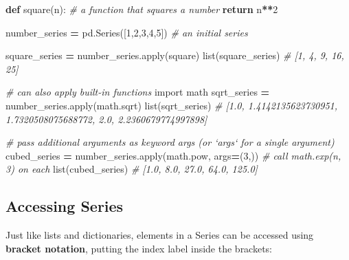 \documentclass[]{book}
\newenvironment{Shaded}{\begin{snugshade}}{\end{snugshade}}
\newcommand{\KeywordTok}[1]{\textcolor[rgb]{0.13,0.29,0.53}{\textbf{#1}}}
\newcommand{\DecValTok}[1]{\textcolor[rgb]{0.00,0.00,0.81}{#1}}
\newcommand{\ImportTok}[1]{#1}
\newcommand{\CommentTok}[1]{\textcolor[rgb]{0.56,0.35,0.01}{\textit{#1}}}
\newcommand{\ControlFlowTok}[1]{\textcolor[rgb]{0.13,0.29,0.53}{\textbf{#1}}}
\newcommand{\OperatorTok}[1]{\textcolor[rgb]{0.81,0.36,0.00}{\textbf{#1}}}
\newcommand{\BuiltInTok}[1]{#1}
\newcommand{\NormalTok}[1]{#1}
\begin{document}
\begin{Shaded}
\begin{Highlighting}[]
\KeywordTok{def}\NormalTok{ square(n):  }\CommentTok{# a function that squares a number}
    \ControlFlowTok{return}\NormalTok{ n}\OperatorTok{**}\DecValTok{2}

\NormalTok{number_series }\OperatorTok{=}\NormalTok{ pd.Series([}\DecValTok{1}\NormalTok{,}\DecValTok{2}\NormalTok{,}\DecValTok{3}\NormalTok{,}\DecValTok{4}\NormalTok{,}\DecValTok{5}\NormalTok{])  }\CommentTok{# an initial series}

\NormalTok{square_series }\OperatorTok{=}\NormalTok{ number_series.}\BuiltInTok{apply}\NormalTok{(square)}
\BuiltInTok{list}\NormalTok{(square_series)  }\CommentTok{# [1, 4, 9, 16, 25]}

\CommentTok{# can also apply built-in functions}
\ImportTok{import}\NormalTok{ math}
\NormalTok{sqrt_series }\OperatorTok{=}\NormalTok{ number_series.}\BuiltInTok{apply}\NormalTok{(math.sqrt)}
\BuiltInTok{list}\NormalTok{(sqrt_series)  }\CommentTok{# [1.0, 1.4142135623730951, 1.7320508075688772, 2.0, 2.2360679774997898]}

\CommentTok{# pass additional arguments as keyword args (or `args` for a single argument)}
\NormalTok{cubed_series }\OperatorTok{=}\NormalTok{ number_series.}\BuiltInTok{apply}\NormalTok{(math.}\BuiltInTok{pow}\NormalTok{, args}\OperatorTok{=}\NormalTok{(}\DecValTok{3}\NormalTok{,)) }\CommentTok{# call math.exp(n, 3) on each}
\BuiltInTok{list}\NormalTok{(cubed_series)  }\CommentTok{# [1.0, 8.0, 27.0, 64.0, 125.0]}
\end{Highlighting}
\end{Shaded}

\hypertarget{accessing-series}{\subsection{Accessing
Series}\label{accessing-series}}

Just like lists and dictionaries, elements in a Series can be accessed
using \textbf{bracket notation}, putting the index label inside the
brackets:
\end{document}

